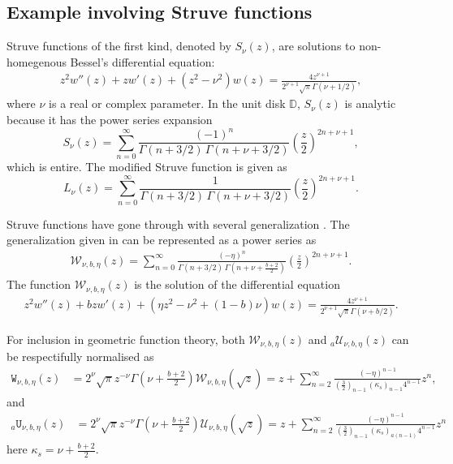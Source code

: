 \documentclass[a4paper,11pt,reqno]{amsart}
\begin{document}
\subsection{Example involving Struve functions}\label{sec:Appl-Struve}
Struve functions of the first kind, denoted by $S_\nu(z)$, are solutions to non-homegenous Bessel’s differential equation:
\begin{align} \label{eqn:SF-ODE}
z^2 w''(z) + z w'(z) + (z^2 - \nu^2) w(z) = \frac{4 z^{\nu+1}}{2^{\nu+1}\sqrt{\pi} \Gamma\left(\nu+1/2\right)},
\end{align}
where $\nu$ is a real or complex parameter. In the unit disk $\mathbb{D}$, $S_\nu(z)$ is analytic because it has the power series expansion
\[
S_\nu(z) = \sum_{n=0}^\infty \frac{(-1)^n}{\Gamma(n + 3/2) \,\Gamma(n+\nu+ 3/2)} \left( \frac{z}{2} \right)^{2n+\nu+1},
\]
which is entire. The modified Struve function is given as 
\[
L_\nu(z) = \sum_{n=0}^\infty \frac{1}{\Gamma(n + 3/2) \,\Gamma(n+\nu+ 3/2)} \left( \frac{z}{2} \right)^{2n+\nu+1}.
\]

Struve functions have gone through with several generalization \cite{Yagmur-Orhan, Ali-Mondal-Nisar}. The generalization given in \cite{Yagmur-Orhan} can be represented as a power series as 
\begin{align}\label{eqn:GSF-Orhan}
   \mathcal{W}_{\nu, b, \eta}(z)= \sum_{n=0}^{\infty} \frac{(-\eta)^n}{\Gamma(n + 3/2) \,\Gamma\left(n+\nu+ \tfrac{b+2}{2} \right)}\left( \frac{z}{2} \right)^{2n+\nu+1}.
\end{align}
The function $\mathcal{W}_{\nu, b, \eta}(z)$ is the solution of the differential equation 
\begin{align} \label{eqn:GSF-ODE}
z^2 w''(z) + b z w'(z) + (\eta z^2 - \nu^2+ (1-b) \nu) w(z) = \frac{4 z^{\nu+1}}{2^{\nu+1}\sqrt{\pi} \Gamma\left(\nu+b/2\right)}. 
\end{align}

For inclusion in geometric function theory, both $\mathcal{W}_{\nu, b, \eta}(z)$ and ${}_a\mathcal{U}_{\nu, b, \eta}(z)$ can be respectifully normalised as 
\begin{align}\label{eqn:GSF-Orhan-normal} 
   \mathtt{W}_{\nu, b, \eta}(z)&= 2^{\nu} \sqrt{\pi} z^{-\nu} \Gamma\left(\nu+ \tfrac{b+2}{2} \right) \mathcal{W}_{\nu, b, \eta}(\sqrt{z}) 
    =z+\sum_{n=2}^{\infty} \tfrac{(-\eta)^{n-1}}{\left(\tfrac{3}{2}\right)_{n-1} \,\left(\kappa_{s}  \right)_{n-1} 4^{n-1}} z^n,
\end{align}
and 
\begin{align}\label{eqn:GSF-a-normal} 
   {}_a\mathtt{U}_{\nu, b, \eta}(z)&= 2^{\nu} \sqrt{\pi} z^{-\nu} \Gamma\left(\nu+ \tfrac{b+2}{2} \right) \mathcal{U}_{\nu, b, \eta}(\sqrt{z})    
   =z+\sum_{n=2}^{\infty} \tfrac{(-\eta)^{n-1}}{\left(\tfrac{3}{2}\right)_{n-1} \,\left(\kappa_{s} \right)_{a(n-1)} 4^{n-1}}z^{n}
\end{align}
here $\kappa_{s}=\nu+ \tfrac{b+2}{2}.$ 
\end{document}
